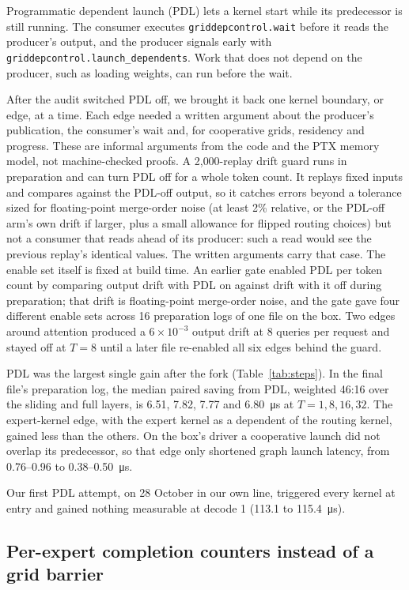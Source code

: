 \documentclass[11pt]{article}
\begin{document}
Programmatic dependent launch (PDL) lets a kernel start while its predecessor is
still running. The consumer executes \texttt{griddepcontrol.wait} before it reads
the producer's output, and the producer signals early with
\texttt{griddepcontrol.launch\_dependents}. Work that does not depend on the
producer, such as loading weights, can run before the wait.

After the audit switched PDL off, we brought it back one kernel boundary, or edge,
at a time. Each edge needed a written argument about the producer's publication,
the consumer's wait and, for cooperative grids, residency and progress. These are
informal arguments from the code and the PTX memory model, not machine-checked
proofs. A 2{,}000-replay drift guard runs in preparation and can turn PDL off for a
whole token count. It replays fixed inputs and compares against the PDL-off
output, so it catches errors beyond a tolerance sized for floating-point
merge-order noise (at least 2\% relative, or the PDL-off arm's own drift if
larger, plus a small allowance for flipped routing choices) but not a consumer that reads ahead of its
producer: such a read would see the previous replay's identical
values. The written arguments carry that case. The enable set itself is fixed at
build time. An earlier gate enabled PDL per token count by comparing output drift
with PDL on against drift with it off during preparation; that drift is
floating-point merge-order noise, and the gate gave four different enable sets
across 16 preparation logs of one file on the box. Two edges around attention produced a
$6\times10^{-3}$ output drift at 8 queries per request and stayed off at $T=8$
until a later file re-enabled all six edges behind the guard.

PDL was the largest single gain after the fork (Table~\ref{tab:steps}). In the
final file's preparation log, the median paired saving from PDL, weighted 46:16
over the sliding and full layers, is 6.51, 7.82, 7.77 and \SI{6.80}{\micro\second}
at $T = 1, 8, 16, 32$. The expert-kernel edge, with the expert kernel as a
dependent of the routing kernel, gained less than the others. On the box's driver
a cooperative launch did not overlap its predecessor, so that edge only shortened
graph launch latency, from
0.76--0.96 to 0.38--\SI{0.50}{\micro\second}.

Our first PDL attempt, on 28 October in our own line, triggered every kernel at
entry and gained nothing measurable at decode 1 (\SI{113.1}{} to
\SI{115.4}{\micro\second}).

\subsection{Per-expert completion counters instead of a grid barrier}
\label{sec:counters}
\end{document}
